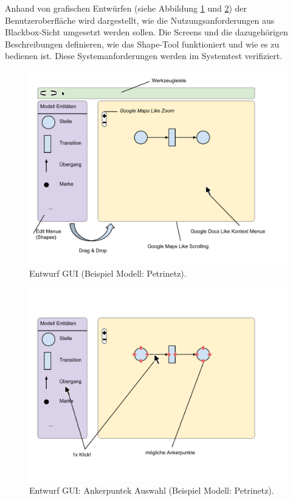Anhand von grafischen Entwürfen (siehe Abbildung
\ref{fig.gui} und \ref{fig.guiAnker}) der Benutzeroberfläche wird dargestellt,
wie die Nutzungsanforderungen aus Blackbox-Sicht umgesetzt werden sollen.
Die Screens und die dazugehörigen Beschreibungen definieren, wie das Shape-Tool 
funktioniert und wie es zu bedienen ist. Diese Systemanforderungen werden
im Systemtest verifiziert.

\begin{figure}[h!]
  \centering
  \includegraphics[width=1.0\textwidth]{Figures/Entwurf_GUI.pdf}
  \caption{Entwurf GUI (Beispiel Modell: Petrinetz).}\label{fig.gui}
\end{figure}

\begin{figure}[h!]
  \centering
  \includegraphics[width=1.0\textwidth]{Figures/Entwurf_GUI_Anker.pdf}
  \caption{Entwurf GUI: Ankerpuntek Auswahl (Beispiel Modell: Petrinetz).}\label{fig.guiAnker}
\end{figure}

